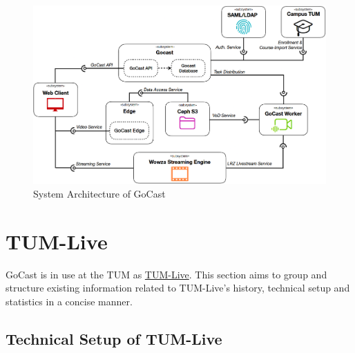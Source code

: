 \begin{figure}[htpb]
    \centering
    \includegraphics[width=\linewidth]{images/ssd-new.png}
    \caption[System Architecture of GoCast]{System Architecture of GoCast}\label{fig:old-system-architecture}
\end{figure}

\section{TUM-Live}\label{section:tum-live-history}

GoCast is in use at the \ac{TUM} as \href{https://tum.live}{TUM-Live}. This section aims to group and structure existing information related to TUM-Live's history, technical setup and statistics in a concise manner. 

\subsection{Technical Setup of TUM-Live}

